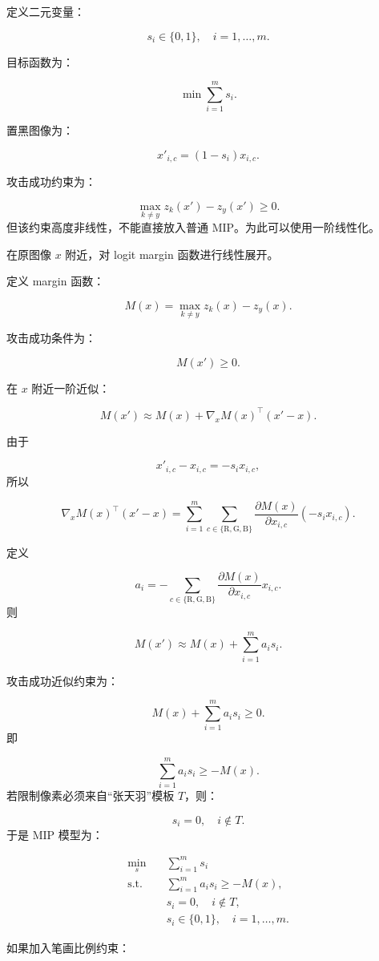﻿\documentclass[UTF8,zihao=-4,fontset=none]{ctexart}
\begin{document}
定义二元变量：

\[
s_i\in\{0,1\},
\quad i=1,\ldots,m.
\]

目标函数为：

\[
\min \sum_{i=1}^{m}s_i.
\]

置黑图像为：

\[
x'_{i,c}=(1-s_i)x_{i,c}.
\]

攻击成功约束为：

\[
\max_{k\ne y}z_k(x')-z_y(x')\ge 0.
\]
\noindent 但该约束高度非线性，不能直接放入普通 MIP。为此可以使用一阶线性化。

在原图像 \(x\) 附近，对 logit margin 函数进行线性展开。

定义 margin 函数：

\[
M(x)
=
\max_{k\ne y}z_k(x)-z_y(x).
\]

攻击成功条件为：

\[
M(x')\ge 0.
\]

在 \(x\) 附近一阶近似：

\[
M(x')
\approx
M(x)+\nabla_xM(x)^\top(x'-x).
\]

由于

\[
x'_{i,c}-x_{i,c}
=
-s_ix_{i,c},
\]
\noindent 所以

\[
\nabla_xM(x)^\top(x'-x)
=
\sum_{i=1}^{m}
\sum_{c\in\{\mathrm{R},\mathrm{G},\mathrm{B}\}}
\frac{\partial M(x)}{\partial x_{i,c}}
(-s_ix_{i,c}).
\]

定义

\[
a_i
=
-\sum_{c\in\{\mathrm{R},\mathrm{G},\mathrm{B}\}}
\frac{\partial M(x)}{\partial x_{i,c}}x_{i,c}.
\]
\noindent 则

\[
M(x')
\approx
M(x)+\sum_{i=1}^{m}a_is_i.
\]

攻击成功近似约束为：

\[
M(x)+\sum_{i=1}^{m}a_is_i\ge 0.
\]
\noindent 即

\[
\sum_{i=1}^{m}a_is_i\ge -M(x).
\]
\noindent 若限制像素必须来自“张天羽”模板 \(T\)，则：

\[
s_i=0,\quad i\notin T.
\]
\noindent 于是 MIP 模型为：

\[
\begin{aligned}
\min_s
\quad
&
\sum_{i=1}^{m}s_i\\
\mathrm{s.t.}
\quad
&
\sum_{i=1}^{m}a_is_i\ge -M(x),\\
&
s_i=0,\quad i\notin T,\\
&
s_i\in\{0,1\},
\quad i=1,\ldots,m.
\end{aligned}
\]

如果加入笔画比例约束：
\end{document}
